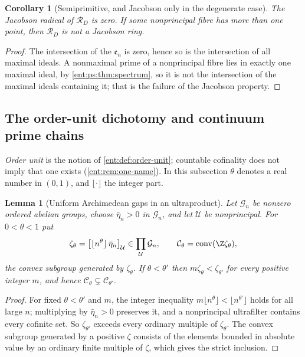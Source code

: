 \documentclass[11pt]{article}
\theoremstyle{plain}
\newtheorem{lemma}[lemma]{Lemma}
\theoremstyle{plain}
\theoremstyle{plain}
\newtheorem{corollary}[corollary]{Corollary}
\theoremstyle{definition}
\theoremstyle{definition}
\theoremstyle{definition}
\theoremstyle{definition}
\theoremstyle{remark}
\DeclareMathOperator{\conv}{conv}
\newcommand{\RD}{\mathcal R_D}\newcommand{\Ucal}{\mathcal U}
\begin{document}
\begin{corollary}[Semiprimitive, and Jacobson only in the degenerate case]
\label{ent:ps:cor:semiprimitive}
The Jacobson radical of $\RD$ is zero. If some nonprincipal fibre has more
than one point, then $\RD$ is not a Jacobson ring.
\end{corollary}
\begin{proof}
The intersection of the $\mathfrak e_n$ is zero, hence so is the intersection
of all maximal ideals. A nonmaximal prime of a nonprincipal fibre lies in
exactly one maximal ideal, by \cref{ent:ps:thm:spectrum}, so it is not the
intersection of the maximal ideals containing it; that is the failure of the
Jacobson property.
\end{proof}

\subsection{The order-unit dichotomy and continuum prime chains}
\label{ent:ps:subsec:dichotomy}

\emph{Order unit} is the notion of \cref{ent:def:order-unit}; countable
cofinality does not imply that one exists (\cref{ent:rem:one-name}). In this
subsection $\theta$ denotes a real number in $(0,1)$, and $\lfloor\cdot\rfloor$
the integer part.

\begin{lemma}[Uniform Archimedean gaps in an ultraproduct]
\label{ent:ps:lem:gaps}
Let $\mathcal G_n$ be nonzero ordered abelian groups, choose
$\bar\eta_n>0$ in $\mathcal G_n$, and let $\Ucal$ be nonprincipal. For
$0<\theta<1$ put
\[
 \zeta_\theta=\bigl[\lfloor n^\theta\rfloor\,\bar\eta_n\bigr]_\Ucal
 \in\prod_\Ucal\mathcal G_n,
 \qquad
 \mathcal C_\theta=\conv(\Z\zeta_\theta),
\]
the convex subgroup generated by $\zeta_\theta$. If $\theta<\theta'$ then
$m\zeta_\theta<\zeta_{\theta'}$ for every positive integer $m$, and hence
$\mathcal C_\theta\subsetneq\mathcal C_{\theta'}$.
\end{lemma}
\begin{proof}
For fixed $\theta<\theta'$ and $m$, the integer inequality
$m\lfloor n^\theta\rfloor<\lfloor n^{\theta'}\rfloor$ holds for all large
$n$; multiplying by $\bar\eta_n>0$ preserves it, and a nonprincipal
ultrafilter contains every cofinite set. So $\zeta_{\theta'}$ exceeds every
ordinary multiple of $\zeta_\theta$. The convex subgroup generated by a
positive $\zeta$ consists of the elements bounded in absolute value by an
ordinary finite multiple of $\zeta$, which gives the strict inclusion.
\end{proof}
\end{document}
